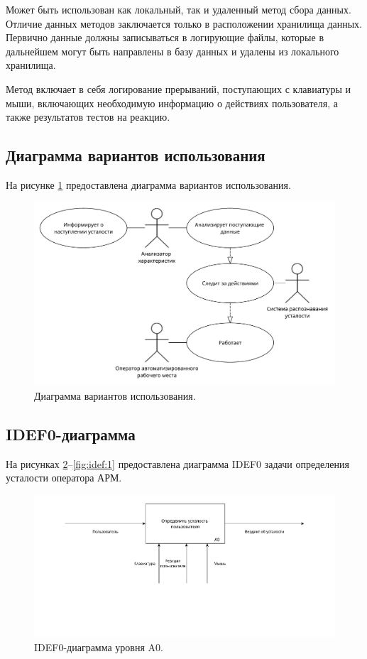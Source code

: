Может быть использован как локальный, так и удаленный метод сбора данных. Отличие данных методов заключается только в расположении хранилища данных. Первично данные должны записываться в логирующие файлы, которые в дальнейшем могут быть направлены в базу данных и удалены из локального хранилища.

Метод включает в себя логирование прерываний, поступающих с клавиатуры и мыши, включающих необходимую информацию о действиях пользователя, а также результатов тестов на реакцию.

\subsection{Диаграмма вариантов использования}
На рисунке \ref{fig:useCase} предоставлена диаграмма вариантов использования.
\begin{figure}[H]
	\centering
	\includegraphics[width=\textwidth]{img/useCaseDiagram.pdf}
	\caption{Диаграмма вариантов использования.}
	\label{fig:useCase}
\end{figure}

\subsection{IDEF0-диаграмма}
На рисунках \ref{fig:idef:0}--\ref{fig:idef:1} предоставлена диаграмма IDEF0 задачи определения усталости оператора АРМ.

\begin{figure}[H]
	\centering
	\includegraphics[width=\textwidth]{img/A0.pdf}
	\caption{IDEF0-диаграмма уровня A0.}
	\label{fig:idef:0}
\end{figure}

